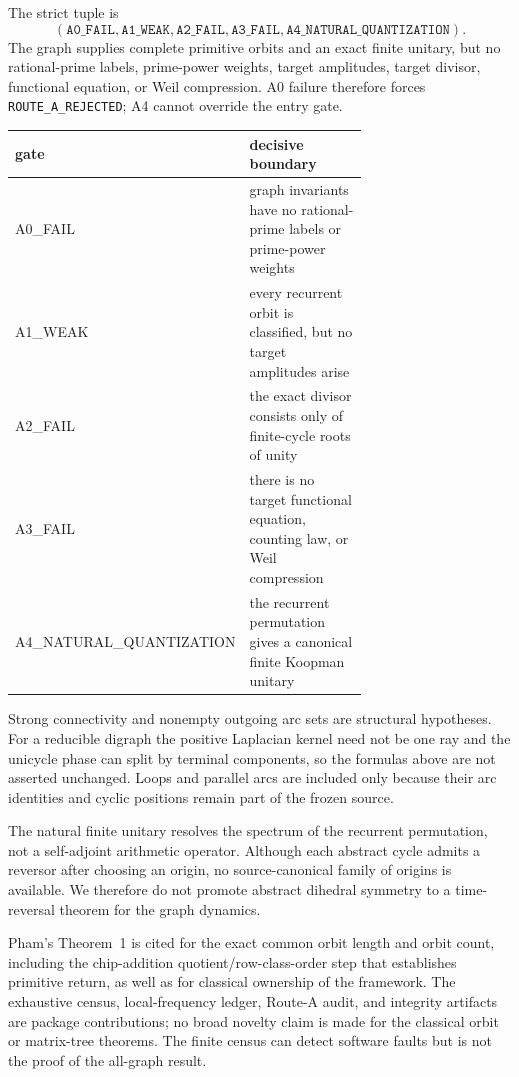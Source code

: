 \documentclass[10pt]{article}
\begin{document}
The strict tuple is
\[
(\texttt{A0\_FAIL},\texttt{A1\_WEAK},\texttt{A2\_FAIL},
 \texttt{A3\_FAIL},\texttt{A4\_NATURAL\_QUANTIZATION}).
\]
The graph supplies complete primitive orbits and an exact finite unitary, but
no rational-prime labels, prime-power weights, target amplitudes, target
divisor, functional equation, or Weil compression.  A0 failure therefore
forces \texttt{ROUTE\_A\_REJECTED}; A4 cannot override the entry gate.

\begin{center}
\small
\begin{tabular}{@{}>{\ttfamily}l p{0.70\linewidth}@{}}
\toprule
gate & decisive boundary\\
\midrule
A0\_FAIL & graph invariants have no rational-prime labels or prime-power weights\\
A1\_WEAK & every recurrent orbit is classified, but no target amplitudes arise\\
A2\_FAIL & the exact divisor consists only of finite-cycle roots of unity\\
A3\_FAIL & there is no target functional equation, counting law, or Weil compression\\
A4\_NATURAL\_QUANTIZATION & the recurrent permutation gives a canonical finite Koopman unitary\\
\bottomrule
\end{tabular}
\end{center}

\par\medskip{}\par\smallskip
Strong connectivity and nonempty outgoing arc sets are structural hypotheses.
For a reducible digraph the positive Laplacian kernel need not be one ray and
the unicycle phase can split by terminal components, so the formulas above are
not asserted unchanged.  Loops and parallel arcs are included only because
their arc identities and cyclic positions remain part of the frozen source.

The natural finite unitary resolves the spectrum of the recurrent permutation,
not a self-adjoint arithmetic operator.  Although each abstract cycle admits
a reversor after choosing an origin, no source-canonical family of origins is
available.  We therefore do not promote abstract dihedral symmetry to a
time-reversal theorem for the graph dynamics.

Pham's Theorem~1 is cited for the exact common orbit length and orbit count,
including the chip-addition quotient/row-class-order step that establishes
primitive return, as well as for classical ownership of the framework.
The exhaustive census, local-frequency ledger, Route-A audit, and integrity
artifacts are package contributions; no broad novelty claim is made for the
classical orbit or matrix-tree theorems.  The finite census can detect software
faults but is not the proof of the all-graph result.
\end{document}
